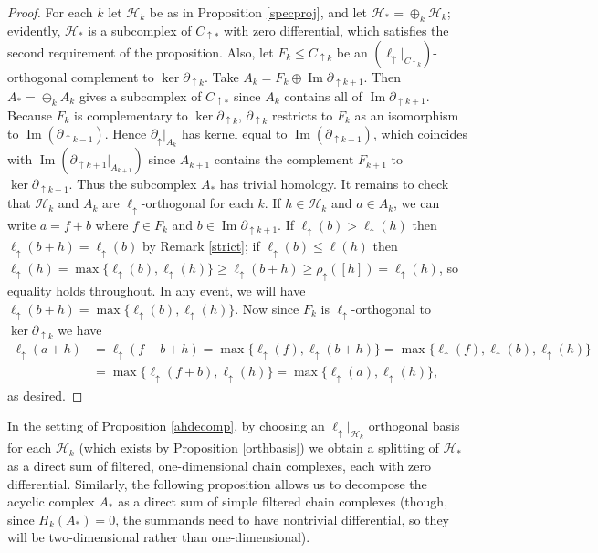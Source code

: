 \documentclass[11pt]{amsart}
\theoremstyle{definition}
\theoremstyle{remark}
\numberwithin{equation}{section}
\DeclareMathOperator{\Img}{Im}
\begin{document}
\begin{proof}
	For each $k$ let $\mathcal{H}_k$ be as in Proposition \ref{specproj}, and let $\mathcal{H}_*=\oplus_k\mathcal{H}_k$; evidently, $\mathcal{H}_*$ is a subcomplex of $C_{\uparrow *}$ with zero differential, which satisfies the second requirement of the proposition.  Also, let $F_k\leq C_{\uparrow k} $ be an $(\ell_{\uparrow}|_{C_{\uparrow k}})$-orthogonal complement to $\ker\partial_{\uparrow k}$.  Take $A_k=F_k\oplus \Img\partial_{\uparrow k+1}$.  Then $A_*=\oplus_k A_k$ gives a subcomplex of $C_{\uparrow *}$ since $A_k$ contains all of $\Img\partial_{\uparrow k+1}$.  Because $F_{k}$ is complementary to $\ker\partial_{\uparrow k}$, $\partial_{\uparrow k}$ restricts to $F_k$ as an isomorphism to $\Img(\partial_{\uparrow k-1})$. Hence $\partial_{\uparrow}|_{A_k}$ has kernel equal to $\Img(\partial_{\uparrow k+1})$, which coincides with $\Img(\partial_{\uparrow k+1}|_{A_{k+1}})$ since $A_{k+1}$ contains the complement $F_{k+1}$ to $\ker\partial_{\uparrow k+1}$.  Thus the subcomplex $A_*$ has trivial homology.
	It remains to check that $\mathcal{H}_k$ and $A_k$ are $\ell_{\uparrow}$-orthogonal for each $k$.  If $h\in \mathcal{H}_k$ and $a\in A_k$, we can write $a=f+b$ where $f\in F_k$ and $b\in \Img\partial_{\uparrow k+1}$.  If $\ell_{\uparrow}(b)>\ell_{\uparrow}(h)$ then $\ell_{\uparrow}(b+h)=\ell_{\uparrow}(b)$ by Remark \ref{strict}; if $\ell_{\uparrow}(b)\leq \ell(h)$ then $\ell_{\uparrow}(h)=\max\{\ell_{\uparrow}(b),\ell_{\uparrow}(h)\}\geq \ell_{\uparrow}(b+h)\geq \rho_{\uparrow}([h])=\ell_{\uparrow}(h)$, so equality holds throughout.  In any event, we will have $\ell_{\uparrow}(b+h)=\max\{\ell_{\uparrow}(b),\ell_{\uparrow}(h)\}$.  Now since $F_k$ is $\ell_{\uparrow}$-orthogonal to $\ker\partial_{\uparrow k}$ we have \begin{align*} \ell_{\uparrow}(a+h)&=\ell_{\uparrow}(f+b+h)=\max\{\ell_{\uparrow}(f),\ell_{\uparrow}(b+h)\}=\max\{\ell_{\uparrow}(f),\ell_{\uparrow}(b),\ell_{\uparrow}(h)\}\\ &=\max\{\ell_{\uparrow}(f+b),\ell_{\uparrow}(h)\}=\max\{\ell_{\uparrow}(a),\ell_{\uparrow}(h)\},\end{align*} as desired.
\end{proof}

In the setting of Proposition \ref{ahdecomp}, by choosing an $\ell_{\uparrow}|_{\mathcal{H}_k}$ orthogonal basis for each $\mathcal{H}_k$ (which exists by Proposition \ref{orthbasis}) we obtain a splitting of $\mathcal{H}_*$ as a direct sum of filtered, one-dimensional chain complexes, each with zero differential.  Similarly, the following proposition allows us to decompose the acyclic complex $A_*$ as a direct sum of simple filtered chain complexes (though, since $H_k(A_*)=0$, the summands need to have nontrivial differential, so they will be two-dimensional rather than one-dimensional).
\end{document}
